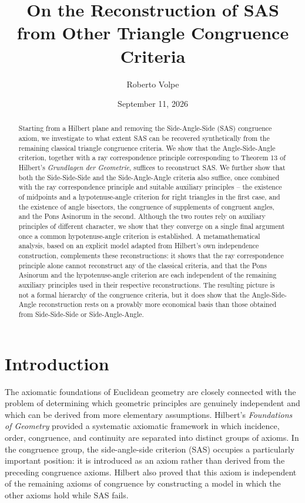 \documentclass[11pt,a4paper]{article}
\title{On the Reconstruction of SAS from Other Triangle Congruence Criteria}
\author{Roberto Volpe}
\date{September 11, 2026}
\theoremstyle{definition}
\theoremstyle{remark}
\numberwithin{equation}{section}
\begin{document}
\maketitle

\begin{abstract}
Starting from a Hilbert plane and removing the Side-Angle-Side (SAS) congruence axiom, we
investigate to what extent SAS can be recovered synthetically from the remaining classical
triangle congruence criteria. We show that the Angle-Side-Angle criterion, together with a
ray correspondence principle corresponding to Theorem 13 of Hilbert's \emph{Grundlagen der
Geometrie}, suffices to reconstruct SAS. We further show that both the Side-Side-Side and
the Side-Angle-Angle criteria also suffice, once combined with the ray correspondence
principle and suitable auxiliary principles -- the existence of midpoints and a
hypotenuse-angle criterion for right triangles in the first case, and the existence of angle
bisectors, the congruence of supplements of congruent angles, and the Pons Asinorum in the
second. Although the two routes rely on auxiliary principles of different character, we show
that they converge on a single final argument once a common hypotenuse-angle criterion is
established. A metamathematical analysis, based on an explicit model adapted from Hilbert's
own independence construction, complements these reconstructions: it shows that the ray
correspondence principle alone cannot reconstruct any of the classical criteria, and that the
Pons Asinorum and the hypotenuse-angle criterion are each independent of the remaining
auxiliary principles used in their respective reconstructions. The resulting picture is not a
formal hierarchy of the congruence criteria, but it does show that the Angle-Side-Angle
reconstruction rests on a provably more economical basis than those obtained from
Side-Side-Side or Side-Angle-Angle.
\end{abstract}

\section{Introduction}\label{PEN_s1}

The axiomatic foundations of Euclidean geometry are closely connected with the problem of determining which geometric principles are genuinely independent and which can be derived from more elementary assumptions. Hilbert's \emph{Foundations of Geometry} provided a systematic axiomatic framework in which incidence, order, congruence, and continuity are separated into distinct groups of axioms. In the congruence group, the side-angle-side criterion (SAS) occupies a particularly important position: it is introduced as an axiom rather than derived from the preceding congruence axioms. Hilbert also proved that this axiom is independent of the remaining axioms of congruence by constructing a model in which the other axioms hold while SAS fails. \cite{Hilbert1950}
\end{document}
